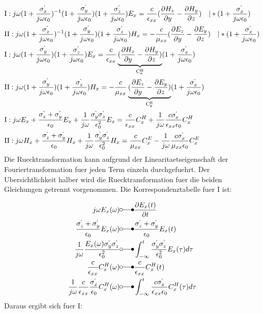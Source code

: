 \documentclass[11pt, ngerman]{article}
\begin{document}
\begin{align}
	&\text{I}: j\omega(1+\frac{\sigma^`_x}{j\omega\epsilon_0})^{-1}(1+\frac{\sigma^`_y}{j\omega\epsilon_0})(1+\frac{\sigma^`_z}{j\omega\epsilon_0})
	E_x = \frac{c}{\epsilon_{xx}}(\frac{\partial H_z}{\partial y} - \frac{\partial H_y}{\partial z})\quad\vert *(1+\frac{\sigma^`_x}{j\omega\epsilon_0})\\
	&\text{II}: j\omega(1+\frac{\sigma^`_x}{j\omega\epsilon_0})^{-1}(1+\frac{\sigma^`_y}{j\omega\epsilon_0})(1+\frac{\sigma^`_z}{j\omega\epsilon_0})
	H_x = -\frac{c}{\mu_{xx}}(\frac{\partial E_z}{\partial y} - \frac{\partial E_y}{\partial z})\quad\vert *(1+\frac{\sigma^`_x}{j\omega\epsilon_0})\\
	&\text{I}: j\omega(1+\frac{\sigma^`_y}{j\omega\epsilon_0})(1+\frac{\sigma^`_z}{j\omega\epsilon_0})
	E_x = \frac{c}{\epsilon_{xx}}\underbrace{(\frac{\partial H_z}{\partial y} - \frac{\partial H_y}{\partial z})}_\mathrm{C_x^H}(1+\frac{\sigma^`_x}{j\omega\epsilon_0})\\
	&\text{II}: j\omega(1+\frac{\sigma^`_y}{j\omega\epsilon_0})(1+\frac{\sigma^`_z}{j\omega\epsilon_0})
	H_x = -\frac{c}{\mu_{xx}}\underbrace{(\frac{\partial E_z}{\partial y} - \frac{\partial E_y}{\partial z})}_\mathrm{C_x^E}(1+\frac{\sigma^`_x}{j\omega\epsilon_0})\\
	&\text{I}: j\omega E_x+\frac{\sigma^`_z+\sigma^`_y}{\epsilon_0}E_x+\frac{1}{j\omega}\frac{\sigma^`_y\sigma^`_z}{\epsilon_0^2}E_x 
	= \frac{c}{\epsilon_{xx}}C_x^H+\frac{1}{j\omega}\frac{c\sigma^`_x}{\epsilon_{xx}\epsilon_0}C_x^H\\
	&\text{II}: j\omega H_x+\frac{\sigma^`_z+\sigma^`_y}{\epsilon_0}H_x+\frac{1}{j\omega}\frac{\sigma^`_y\sigma^`_z}{\epsilon_0^2}H_x
	= \frac{c}{\mu_{xx}}C_x^E-\frac{1}{j\omega}\frac{c\sigma^`_x}{\mu_{xx}\epsilon_0}C_x^E
\end{align}
Die Ruecktransformation kann aufgrund der Linearitaetseigenschaft der Fouriertransformation fuer jeden Term einzeln durchgefuehrt.
Der Ubersichtlichkeit halber wird die Ruecktransformation fuer die beiden Gleichungen getrennt vorgenommen.
Die Korrespondenztabelle fuer I ist:

\begin{align}
	j\omega E_x(\omega) &\laplace \frac{\partial E_x(t)}{\partial t}\\
	\frac{\sgma_z + \sgma_y}{\epsilon_0}E_x(\omega) &\laplace \frac{\sgma_z + \sgma_y}{\epsilon_0}E_x(t)\\
	\frac{1}{j\omega}\frac{E_x(\omega)\sgma_y\sgma_z}{\epsilon_0^2} &\laplace \int_{-\infty}^t\frac{\sgma_y\sgma_z}{\epsilon_0^2}E_x(\tau)d\tau\\
	\frac{c}{\epsilon_{xx}}C_x^H(\omega) &\laplace \frac{c}{\epsilon_{xx}}C_x^H(t)\\
	\frac{1}{j\omega}\frac{c}{\epsilon_{xx}}\frac{\sgma_x}{\epsilon_0}C_x^H(\omega) &\laplace \int_{-\infty}^t \frac{c\sgma_x}{\epsilon_{xx}\epsilon_0}C_x^H(\tau)d\tau\\
\end{align}
Daraus ergibt sich fuer I:
\end{document}
